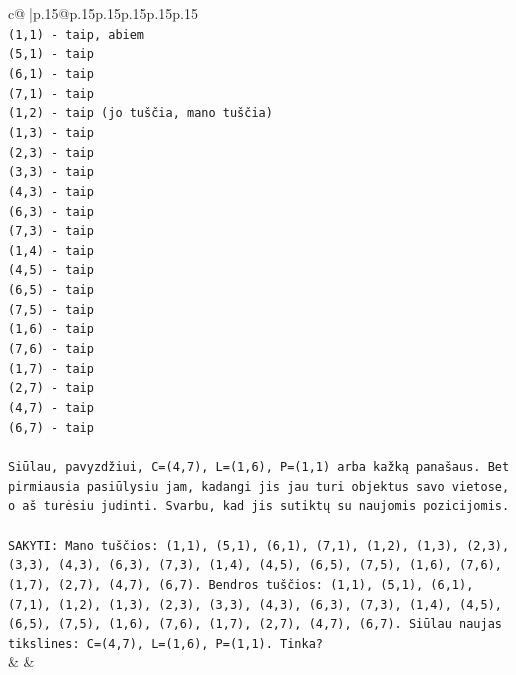 \documentclass{article}
\begin{document}
{\begin{supertabular}{c@{$\;$}|p{.15\linewidth}@{}p{.15\linewidth}p{.15\linewidth}p{.15\linewidth}p{.15\linewidth}p{.15\linewidth}}
{{{\\ 
\texttt{(1,1) {-} taip, abiem} \\
\texttt{(5,1) {-} taip} \\
\texttt{(6,1) {-} taip} \\
\texttt{(7,1) {-} taip} \\
\texttt{(1,2) {-} taip (jo tuščia, mano tuščia)} \\
\texttt{(1,3) {-} taip} \\
\texttt{(2,3) {-} taip} \\
\texttt{(3,3) {-} taip} \\
\texttt{(4,3) {-} taip} \\
\texttt{(6,3) {-} taip} \\
\texttt{(7,3) {-} taip} \\
\texttt{(1,4) {-} taip} \\
\texttt{(4,5) {-} taip} \\
\texttt{(6,5) {-} taip} \\
\texttt{(7,5) {-} taip} \\
\texttt{(1,6) {-} taip} \\
\texttt{(7,6) {-} taip} \\
\texttt{(1,7) {-} taip} \\
\texttt{(2,7) {-} taip} \\
\texttt{(4,7) {-} taip} \\
\texttt{(6,7) {-} taip} \\
\\ 
\texttt{Siūlau, pavyzdžiui, C=(4,7), L=(1,6), P=(1,1) arba kažką panašaus. Bet pirmiausia pasiūlysiu jam, kadangi jis jau turi objektus savo vietose, o aš turėsiu judinti. Svarbu, kad jis sutiktų su naujomis pozicijomis.} \\
\\ 
\texttt{SAKYTI: Mano tuščios: (1,1), (5,1), (6,1), (7,1), (1,2), (1,3), (2,3), (3,3), (4,3), (6,3), (7,3), (1,4), (4,5), (6,5), (7,5), (1,6), (7,6), (1,7), (2,7), (4,7), (6,7). Bendros tuščios: (1,1), (5,1), (6,1), (7,1), (1,2), (1,3), (2,3), (3,3), (4,3), (6,3), (7,3), (1,4), (4,5), (6,5), (7,5), (1,6), (7,6), (1,7), (2,7), (4,7), (6,7). Siūlau naujas tikslines: C=(4,7), L=(1,6), P=(1,1). Tinka?} \\
            }
        }
    }
    & & \\ \\


\end{supertabular}}
\end{document}
